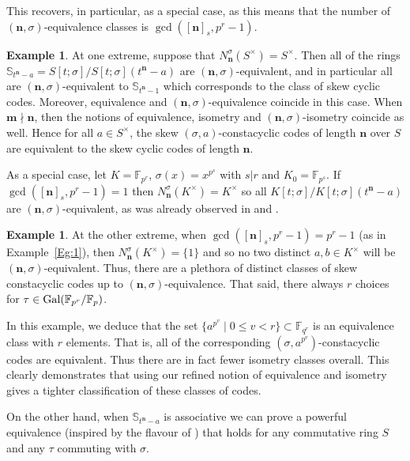 \documentclass[11pt]{amsart}
\theoremstyle{plain}
\theoremstyle{definition}
\newtheorem{example}[theorem]{Example}
\numberwithin{equation}{section}
\numberwithin{figure}{section}
\newcommand{\Sone}[1]{\Stsigma/\Stsigma (t^{\de}-#1)} %
\newcommand{\ring}{S}
\newcommand{\field}{K}
\newcommand{\Stsigma}{S[t;\sigma]}
\newcommand{\Kone}[1]{K[t;\sigma]/K[t;\sigma](t^{\de}-#1)}
\newcommand{\os}{\mathbf{m}}  %
\newcommand{\de}{\mathbf{n}}  %
\begin{document}
This recovers, in particular, \cite[Theorem 6]{OuazzouNajmeddineAydin2025} as a special case, as this means that the number of  $(\de,\sigma)$-equivalence classes is $\gcd([\de]_{s},p^r-1)$.

\begin{example}
At one extreme, suppose that $N_{\de}^\sigma(\ring^\times)=\ring^\times$. Then  all of the rings $\mathbb{S}_{t^\de-a}=\Sone{a}$ are $(\de,\sigma)$-equivalent, and  in particular all  are $(\de,\sigma)$-equivalent to $\mathbb{S}_{t^\de-1}$ 
which corresponds to the class of  skew cyclic codes.  Moreover, equivalence and $(\de,\sigma)$-equivalence coincide in this case. When  $\os\nmid \de$, then the notions of equivalence,  isometry and  $(\de,\sigma)$-isometry coincide as well.
Hence for all $a\in S^\times$, the skew $(\sigma,a)$-constacyclic codes of length $\de$ over $S$ are equivalent to the skew cyclic codes of length $\de$.


As a special case, let $\field=\mathbb{F}_{p^r}$, $\sigma(x)=x^{p^s}$ with $s|r$  and $\field_0=\mathbb{F}_{p^s}$. If $\gcd([\de]_s,p^r-1)=1$
then $N_{\de}^\sigma(\field^\times)=\field^\times$ so  all $\Kone{a}$ are  $(\de,\sigma)$-equivalent, as was already observed in \cite[Corollary 2]{OuazzouNajmeddineAydin2025} and \cite[Proposition 1]{BoulanouarBatoulBoucher2021}.
\end{example}

\begin{example}\label{e:important}
At the other extreme, when
$\gcd([\de]_s,p^r-1)=p^r-1$ (as in Example~\ref{Eg:1}), then $N_{\de}^\sigma(\field^\times)=\{1\}$ and so no two distinct $a,b\in \field^\times$ will be  $(\de,\sigma)$-equivalent. Thus, there are a plethora of distinct classes of skew constacyclic codes up to $(\de,\sigma)$-equivalence.  That said, there always $r$ choices for $\tau\in {\rm Gal}(\mathbb{F}_{p^r}/\mathbb{F}_{p})$.


In this example, we deduce that the set $\{a^{p^{v}}\mid 0\leq v < r\}\subset \mathbb{F}_{q^r}$ is an equivalence class with $r$ elements.  That is, all of the corresponding $(\sigma,a^{p^v})$-constacyclic codes are equivalent. Thus there are in fact  fewer isometry classes overall. This clearly demonstrates that  using our refined notion of equivalence and isometry gives a tighter classification of these classes of codes.
    \end{example}


On the other hand,  when $\mathbb{S}_{t^\de-a}$ 
is associative we can prove a powerful equivalence (inspired by the flavour of \cite[Theorem 4]{OuazzouNajmeddineAydin2025}) that holds for  any  commutative ring $S$ and any $\tau$ commuting with $\sigma$.
\end{document}
